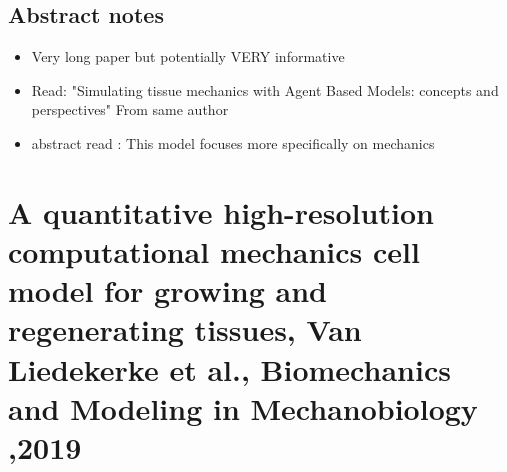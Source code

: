 \documentclass[11pt,a4paper]{article}
\begin{document}
\subsection*{Abstract notes}
\begin{itemize}
\item Very long paper but potentially VERY informative
\item Read:  "Simulating tissue mechanics with Agent Based Models: concepts and perspectives" From same author
\item abstract read : This model focuses more specifically on mechanics
\end{itemize}

\section*{A quantitative high-resolution computational mechanics cell model for growing and regenerating tissues, Van Liedekerke et al., Biomechanics and Modeling in Mechanobiology ,2019}
\end{document}
